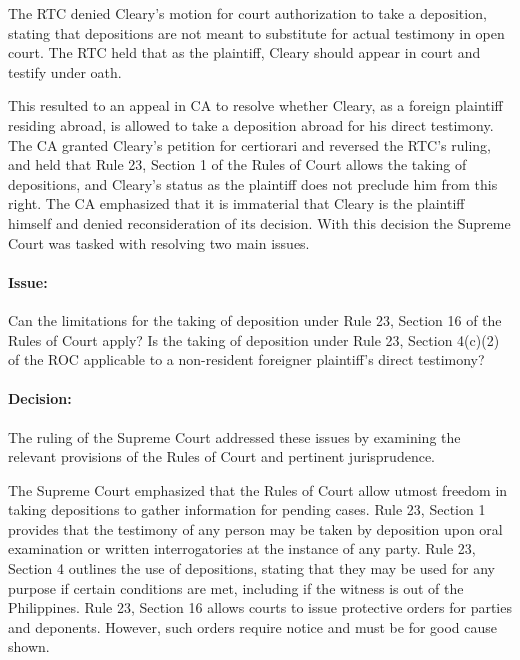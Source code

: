 \documentclass[
12pt,
oneside,
onehalfspacing,
headsepline
]{DigestCollection}
\begin{document}
The RTC denied Cleary's motion for court authorization to take a deposition, stating that depositions are not meant to substitute for actual testimony in open court. The RTC held that as the plaintiff, Cleary should appear in court and testify under oath.

This resulted to an appeal in CA to resolve whether Cleary, as a foreign plaintiff residing abroad, is allowed to take a deposition abroad for his direct testimony. The CA granted Cleary's petition for certiorari and reversed the RTC's ruling, and held that Rule 23, Section 1 of the Rules of Court allows the taking of depositions, and Cleary's status as the plaintiff does not preclude him from this right. The CA emphasized that it is immaterial that Cleary is the plaintiff himself and denied reconsideration of its decision. With this decision the Supreme Court was tasked with resolving two main issues.

\paragraph{Issue:}
\label{deebb5a0-09fd-11ef-932c-63c852f65e48}


Can the limitations for the taking of deposition under Rule 23, Section 16 of the Rules of Court apply? Is the taking of deposition under Rule 23, Section 4(c)(2) of the ROC applicable to a non-resident foreigner plaintiff’s direct testimony?

\paragraph{Decision:}
\label{e12a8210-09fd-11ef-932c-63c852f65e48}


The ruling of the Supreme Court addressed these issues by examining the relevant provisions of the Rules of Court and pertinent jurisprudence. 

The Supreme Court emphasized that the Rules of Court allow utmost freedom in taking depositions to gather information for pending cases. Rule 23, Section 1 provides that the testimony of any person may be taken by deposition upon oral examination or written interrogatories at the instance of any party. Rule 23, Section 4 outlines the use of depositions, stating that they may be used for any purpose if certain conditions are met, including if the witness is out of the Philippines. Rule 23, Section 16 allows courts to issue protective orders for parties and deponents. However, such orders require notice and must be for good cause shown.
\end{document}
